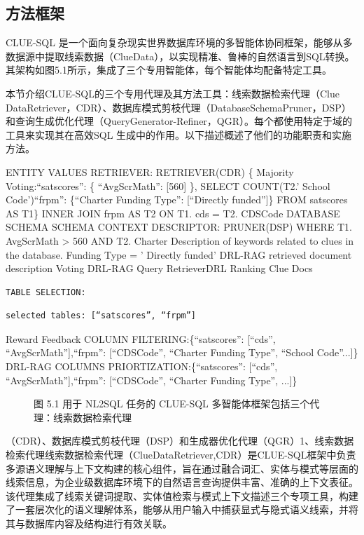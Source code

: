\documentclass[12pt,a4paper,openright,UTF8]{ctexbook}
\begin{document}
\subsection{方法框架}

CLUE-SQL 是一个面向复杂现实世界数据库环境的多智能体协同框架，能够从多数据源中提取线索数据（ClueData），以实现精准、鲁棒的自然语言到SQL转换。其架构如图5.1所示，集成了三个专用智能体，每个智能体均配备特定工具。


本节介绍CLUE-SQL的三个专用代理及其方法工具：线索数据检索代理（Clue DataRetriever，CDR）、数据库模式剪枝代理（DatabaseSchemaPruner，DSP）和查询生成优化代理（QueryGenerator-Refiner，QGR）。每个都使用特定于域的工具来实现其在高效SQL 生成中的作用。以下描述概述了他们的功能职责和实施方法。


ENTITY VALUES RETRIEVER: RETRIEVER(CDR) \{ Majority Voting:“satscores”: \{ “AvgScrMath”: [560] \}, SELECT COUNT(T2.' School Code')“frpm”: \{“Charter Funding Type”: [“Directly funded”]\} FROM satscores AS T1\} INNER JOIN frpm AS T2 ON T1. cds = T2. CDSCode DATABASE SCHEMA SCHEMA CONTEXT DESCRIPTOR: PRUNER(DSP) WHERE T1. AvgScrMath > 560 AND T2. Charter Description of keywords related to clues in the database. Funding Type = ' Directly funded' DRL-RAG retrieved document description Voting DRL-RAG Query RetrieverDRL Ranking Clue Docs

\begin{lstlisting}
TABLE SELECTION:
\end{lstlisting}


\begin{lstlisting}
selected tables: [“satscores”, “frpm”]
\end{lstlisting}

Reward Feedback COLUMN FILTERING:\{“satscores”: [“cds”, “AvgScrMath”],“frpm”: [“CDSCode”, “Charter Funding Type”, “School Code”...]\} DRL-RAG COLUMNS PRIORTIZATION:\{“satscores”: [“cds”, “AvgScrMath”],“frpm”: [“CDSCode”, “Charter Funding Type”, ...]\}

\begin{figure}[htbp]
\centering
{}
\caption{图 5.1 用于 NL2SQL 任务的 CLUE-SQL 多智能体框架包括三个代理：线索数据检索代理}
\end{figure}

（CDR）、数据库模式剪枝代理（DSP）和生成器优化代理（QGR）1、线索数据检索代理线索数据检索代理（ClueDataRetriever,CDR）是CLUE-SQL框架中负责多源语义理解与上下文构建的核心组件，旨在通过融合词汇、实体与模式等层面的线索信息，为企业级数据库环境下的自然语言查询提供丰富、准确的上下文表征。该代理集成了线索关键词提取、实体值检索与模式上下文描述三个专项工具，构建了一套层次化的语义理解体系，能够从用户输入中捕获显式与隐式语义线索，并将其与数据库内容及结构进行有效关联。
\end{document}
